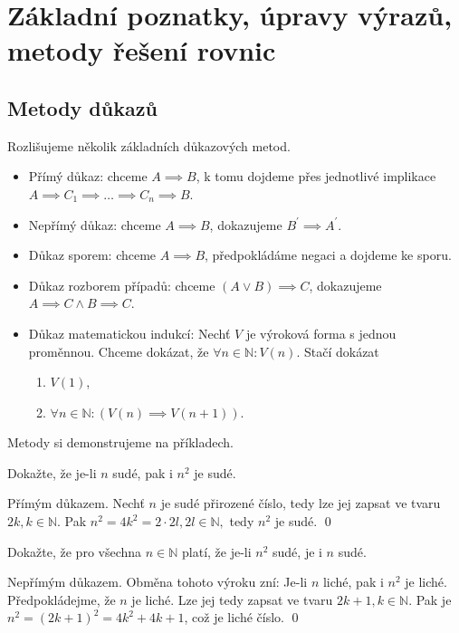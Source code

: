 \section{Základní poznatky, úpravy výrazů, metody řešení rovnic}
\subsection*{Metody důkazů}
Rozlišujeme několik základních důkazových metod.
\begin{itemize}
\item Přímý důkaz: chceme $A\implies B$, k tomu dojdeme přes jednotlivé implikace $A\implies C_1 \implies \dots \implies C_n \implies B$.
\item Nepřímý důkaz: chceme $A\implies B$, dokazujeme $B^\prime \implies A^\prime$.
\item Důkaz sporem: chceme $A\implies B$, předpokládáme negaci a dojdeme ke sporu.
\item Důkaz rozborem případů: chceme $(A\lor B)\implies C$, dokazujeme $A\implies C\land B\implies C$.
\item Důkaz matematickou indukcí: Nechť $V$ je výroková forma s jednou proměnnou. Chceme dokázat, že $\forall n\in \mathbb N :V(n)$.
Stačí dokázat
\begin{enumerate}
	\item $V(1)$,
	\item $\forall n\in \mathbb N : (V(n)\implies V(n+1))$.
\end{enumerate}
\end{itemize}

Metody si demonstrujeme na příkladech.

\begin{priklad}\label{dkpr}
Dokažte, že je-li $n$ sudé, pak i $n^2$ je sudé.
\end{priklad}

\begin{reseni}
Přímým důkazem. Nechť $n$ je sudé přirozené číslo, tedy lze jej zapsat ve tvaru $2k, k \in \mathbb N.$
Pak $n^2 = 4k^2 = 2\cdot 2l, 2l\in \mathbb N, $ tedy $n^2$ je sudé. \qed
\end{reseni}

\begin{priklad}\label{prsude}
Dokažte, že pro všechna $n \in \mathbb N$ platí, že je-li $n^2$ sudé, je i $n$ sudé.
\end{priklad}

\begin{reseni}
Nepřímým důkazem. Obměna tohoto výroku zní: Je-li $n$ liché, pak i $n^2$ je liché.
Předpokládejme, že $n$ je liché. Lze jej tedy zapsat ve tvaru $2k+1, k \in \mathbb N $.
Pak je $n^2 = (2k+1)^2 = 4k^2+4k + 1$, což je liché číslo. \qed
\end{reseni}

